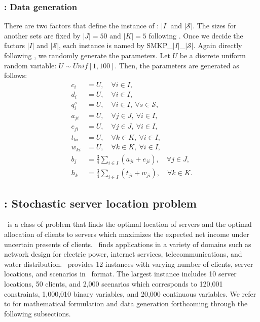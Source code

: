 \subsubsection{\smkp: Data generation}
There are two factors that define the instance of \smkp: $|I|$ and $|\mathcal{S}|$. The sizes for another sets are fixed by $|J|=50$ and $|K|=5$ following \cite{journal:AAD2014}. Once we decide the factors $|I|$ and $|\mathcal{S}|$, each instance is named by SMKP\_$|I|$\_$|\mathcal{S}|$. Again directly following \cite{journal:AAD2014}, we randomly generate the parameters. Let $U$ be a discrete uniform random variable: $U\sim Unif[1,100]$. Then, the parameters are generated as follows:
\begin{align*}
c_i		&=	U,\quad\forall i\in I, \\
d_i		&=	U,\quad\forall i\in I, \\
q_i^s	&= 	U,\quad\forall i\in I,\ \forall s\in\mathcal{S},\\
a_{ji}	&=	U,\quad\forall j\in J,\ \forall i\in I, \\
e_{ji}	&=	U,\quad\forall j\in J,\ \forall i\in I, \\
t_{ki}	&=	U,\quad\forall k\in K,\ \forall i\in I, \\
w_{ki}	&=	U,\quad\forall k\in K,\ \forall i\in I,  \\
b_j		&=	\frac{3}{4}\sum_{i\in I}\left(a_{ji}+e_{ji}\right),\quad\forall j\in J, \\
h_k		&=	\frac{3}{4}\sum_{i\in I}\left(t_{ji}+w_{ji}\right),\quad\forall k\in K. 
\end{align*}

\subsection{\sslp: Stochastic server location problem} \label{SSLP}
\sslp\ is a class of problem that finds the optimal location of servers and the optimal allocation of clients to servers which maximizes the expected net income under uncertain presents of clients. \sslp\ finds applications in a variety of domains such as network design for electric power, internet services, telecommunications, and water distribution. \siplib\ provides 12 instances with varying number of clients, server locations, and scenarios in \smps\ format. The largest instance includes 10 server locations, 50 clients, and 2,000 scenarios which corresponds to 120,001 constraints, 1,000,010 binary variables, and 20,000 continuous variables. We refer to \cite{journal:NS2005} for mathematical formulation and data generation forthcoming through the following subsections.

